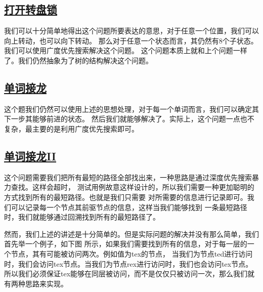 \documentclass[../../main.tex]{subfiles}
\begin{document}


\subsection{\href{https://leetcode.cn/problems/open-the-lock/}{打开转盘锁}}

我们可以十分简单地得出这个问题所要表达的意思，对于任意一个位置，我们可以向上转动，也可以向下转动。
那么对于任意一个状态而言，其仍然有8个子状态。我们可以使用广度优先搜索解决这个问题。
这个问题本质上就和上个问题一样了。我们仍然抽象为了树的结构解决这个问题。



\subsection{\href{https://leetcode.cn/problems/word-ladder/}{单词接龙}}

这个题我们仍然可以使用上述的思想处理，对于每一个单词而言，我们可以确定其下一步其能够前进的状态。
然后我们就能够解决了。实际上，这个问题一点也不复杂，最主要的是利用广度优先搜索即可。



\subsection{\href{https://leetcode.cn/problems/word-ladder-ii/}{单词接龙II}}

这个问题需要我们把所有最短的路径全部找出来，一种思路是通过深度优先搜索暴力查找。这样会超时，
测试用例故意这样设计的，所以我们需要一种更加聪明的方式找到所有的最短路径。也就是我们只需要
对所需要的信息进行记录即可。我们可以记录每一个节点其前驱节点的信息，这样当我们能够找到
一条最短路径时，我们就能够通过回溯找到所有的最短路径了。

然而，我们上述的讲述是十分简单的。但是实际问题的解决并没有那么简单，我们首先举一个例子，如下图
所示，如果我们需要找到所有的信息，对于每一层的一个节点，其有可能被访问两次。例如值为tex的节点，
当我们为节点ted进行访问时，我们会访问tex节点。当我们为节点rex进行访问时，我们也会访问tex节点。
所以我们必须保证tex能够在同层被访问，而不是仅仅只被访问一次，那么我们就有两种思路来实现。
\end{document}
